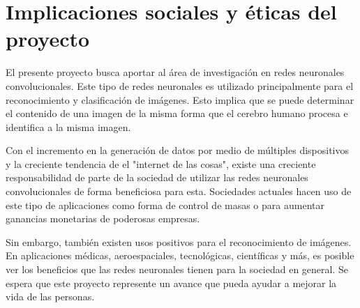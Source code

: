 \chapter{Implicaciones sociales y éticas del proyecto}

El presente proyecto busca aportar al área de investigación en
redes neuronales convolucionales. Este tipo de redes neuronales
es utilizado principalmente para el reconocimiento y clasificación
de imágenes. Esto implica que se puede determinar el contenido
de una imagen de la misma forma que el cerebro humano procesa
e identifica a la misma imagen.

Con el incremento en la generación de datos por medio
de múltiples dispositivos y la creciente tendencia de el "internet de las cosas",
existe una creciente responsabilidad de parte de la sociedad de utilizar
las redes neuronales convolucionales de forma beneficiosa para esta.
Sociedades actuales hacen uso de este tipo de aplicaciones como
forma de control de masas o para aumentar ganancias monetarias de
poderosas empresas.

Sin embargo, también existen usos positivos para el reconocimiento
de imágenes. En aplicaciones médicas, aeroespaciales, tecnológicas,
científicas
y más, es posible ver los beneficios que las redes neuronales tienen
para la sociedad en general. Se espera que este proyecto represente
un avance que pueda ayudar a mejorar la vida de las personas.